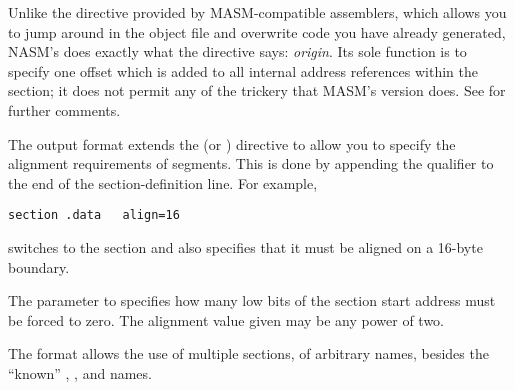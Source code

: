 Unlike the  directive provided by MASM-compatible assemblers,
which allows you to jump around in the object file and overwrite
code you have already generated, NASM's  does exactly what
the directive says: \emph{origin}. Its sole function is to specify one
offset which is added to all internal address references within the
section; it does not permit any of the trickery that MASM's version
does. See  for further comments.


The  output format extends the  (or )
directive to allow you to specify the alignment requirements of segments.
This is done by appending the  qualifier to the end of
the section-definition line. For example,

\begin{lstlisting}
section .data   align=16
\end{lstlisting}

switches to the section  and also specifies that it must be
aligned on a 16-byte boundary.

The parameter to  specifies how many low bits of the
section start address must be forced to zero. The alignment value
given may be any power of two.


The  format allows the use of multiple sections, of arbitrary names,
besides the ``known'' , , and  names.

